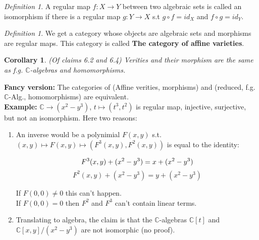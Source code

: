 \documentclass[12pt]{article}
\newtheorem{corollary}[theorem]{Corollary}
\theoremstyle{remark}
\newtheorem{definition}[theorem]{Definition}
\begin{document}
\begin{definition}

A regular map $f:X\rightarrow Y$ between two algebraic sets is called an isomorphism if there is a regular map $g:Y\rightarrow X$ s.t $g\circ f = id_X$ and $f\circ g=id_Y$.

\end{definition}

\begin{definition}

We get a category whose objects are algebraic sets and morphisms are regular maps. This category is called \textbf{The category of affine varieties}.

\end{definition}

\begin{corollary}

(Of claims 6.2 and 6.4) Verities and their morphism are the same as f.g. $\mathbb{C}$-algebras and homomorphisms.

\end{corollary}

\textbf{Fancy version:} The categories of (Affine verities, morphisms) and (reduced, f.g. $\mathbb{C}$-Alg., homomorphisms) are equivalent. \\

\textbf{Example:} $\mathbb{C}\rightarrow (x^2-y^3)$, $t\mapsto (t^3,t^2)$ is regular map, injective, surjective, but not an isomorphism. Here two reasons:

\begin{enumerate}

    \item An inverse would be a polynimial $F(x,y)$ s.t. $(x,y)\mapsto F(x,y)\mapsto (F^3(x,y),F^2(x,y))$ is equal to the identity:

\[
        F^3(x,y) +(x^2-y^3) = x +(x^2-y^3)\\
\]
\[
        F^2(x,y)+(x^2-y^3) =y+(x^2-y^3)
\]

    If $F(0,0)\neq 0$ this can't happen.\\

    If $F(0,0) = 0$ then $F^2$ and $F^3$ can't contain linear terms.

    \item Translating to algebra, the claim is that the $\mathbb{C}$-algebras $\mathbb{C}[t]$ and $\mathbb{C}[x,y]/(x^2-y^3)$ are not isomorphic (no proof).

\end{enumerate}
\end{document}
